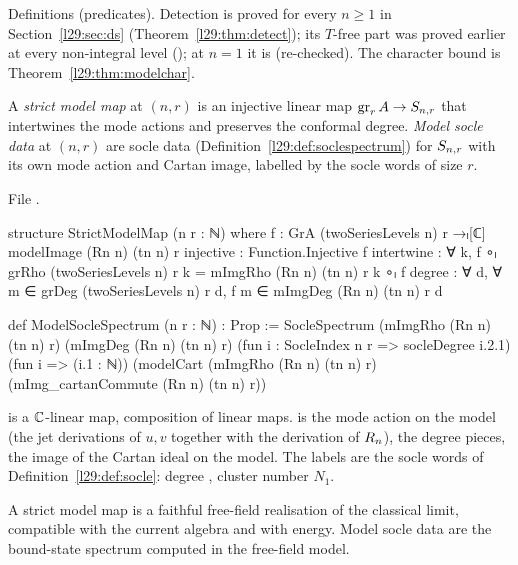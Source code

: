 \begin{status}
Definitions (predicates). Detection is proved for every $n\ge1$ in Section~\ref{l29:sec:ds}
(Theorem~\ref{l29:thm:detect}); its $T$-free part was proved earlier at every non-integral level
(); at $n=1$ it is  (re-checked). The character bound is
Theorem~\ref{l29:thm:modelchar}.
\end{status}

\begin{definition}\label{l29:def:strict}
A \emph{strict model map} at $(n,r)$ is an injective linear map $\operatorname{gr}_rA\to S_{n,r}$ that intertwines the
mode actions and preserves the conformal degree. \emph{Model socle data} at $(n,r)$ are socle data
(Definition~\ref{l29:def:soclespectrum}) for $S_{n,r}$ with its own mode action and Cartan image, labelled by the
socle words of size $r$.
\end{definition}

\noindent File .
\begin{leancode}
structure StrictModelMap (n r : ℕ) where
  f : GrA (twoSeriesLevels n) r →ₗ[ℂ] modelImage (Rn n) (tn n) r
  injective : Function.Injective f
  intertwine : ∀ k, f ∘ₗ grRho (twoSeriesLevels n) r k = mImgRho (Rn n) (tn n) r k ∘ₗ f
  degree : ∀ d, ∀ m ∈ grDeg (twoSeriesLevels n) r d, f m ∈ mImgDeg (Rn n) (tn n) r d

def ModelSocleSpectrum (n r : ℕ) : Prop :=
  SocleSpectrum (mImgRho (Rn n) (tn n) r) (mImgDeg (Rn n) (tn n) r)
    (fun i : SocleIndex n r => socleDegree i.2.1) (fun i => (i.1 : ℕ))
    (modelCart (mImgRho (Rn n) (tn n) r) (mImg_cartanCommute (Rn n) (tn n) r))
\end{leancode}

\begin{dictionary}
 is a ${\mathbb{C}}$-linear map,  composition of linear maps.  is the mode action on the model
(the jet derivations of $u,v$ together with the derivation of $R_n$),  the degree pieces,
 the image of the Cartan ideal on the model. The labels are the socle words of
Definition~\ref{l29:def:socle}: degree , cluster number $N_1$.
\end{dictionary}

\begin{physics}
A strict model map is a faithful free-field realisation of the classical limit, compatible with the current algebra
and with energy. Model socle data are the bound-state spectrum computed in the free-field model.
\end{physics}


